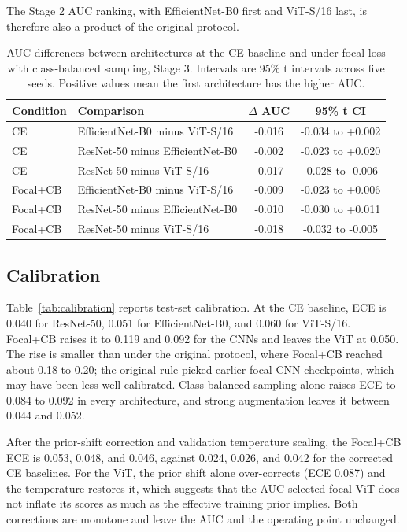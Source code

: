 \documentclass[11pt]{article}
\begin{document}
The Stage 2 AUC ranking, with EfficientNet-B0 first and ViT-S/16 last, is therefore also a product of the original protocol.

\begin{table}[t]
\centering
\small
\caption{AUC differences between architectures at the CE baseline and under focal loss with class-balanced sampling, Stage 3. Intervals are 95\% t intervals across five seeds. Positive values mean the first architecture has the higher AUC.}
\label{tab:auctests}
\begin{tabular}{llcc}
\toprule
Condition & Comparison & $\Delta$ AUC & 95\% t CI \\
\midrule
CE & EfficientNet-B0 minus ViT-S/16 & -0.016 & -0.034 to +0.002 \\
CE & ResNet-50 minus EfficientNet-B0 & -0.002 & -0.023 to +0.020 \\
CE & ResNet-50 minus ViT-S/16 & -0.017 & -0.028 to -0.006 \\
\midrule
Focal+CB & EfficientNet-B0 minus ViT-S/16 & -0.009 & -0.023 to +0.006 \\
Focal+CB & ResNet-50 minus EfficientNet-B0 & -0.010 & -0.030 to +0.011 \\
Focal+CB & ResNet-50 minus ViT-S/16 & -0.018 & -0.032 to -0.005 \\
\bottomrule
\end{tabular}
\end{table}


\subsection{Calibration}

Table~\ref{tab:calibration} reports test-set calibration. At the CE baseline, ECE is 0.040 for ResNet-50, 0.051 for EfficientNet-B0, and 0.060 for ViT-S/16. Focal+CB raises it to 0.119 and 0.092 for the CNNs and leaves the ViT at 0.050. The rise is smaller than under the original protocol, where Focal+CB reached about 0.18 to 0.20; the original rule picked earlier focal CNN checkpoints, which may have been less well calibrated. Class-balanced sampling alone raises ECE to 0.084 to 0.092 in every architecture, and strong augmentation leaves it between 0.044 and 0.052.

After the prior-shift correction and validation temperature scaling, the Focal+CB ECE is 0.053, 0.048, and 0.046, against 0.024, 0.026, and 0.042 for the corrected CE baselines. For the ViT, the prior shift alone over-corrects (ECE 0.087) and the temperature restores it, which suggests that the AUC-selected focal ViT does not inflate its scores as much as the effective training prior implies. Both corrections are monotone and leave the AUC and the operating point unchanged.
\end{document}

